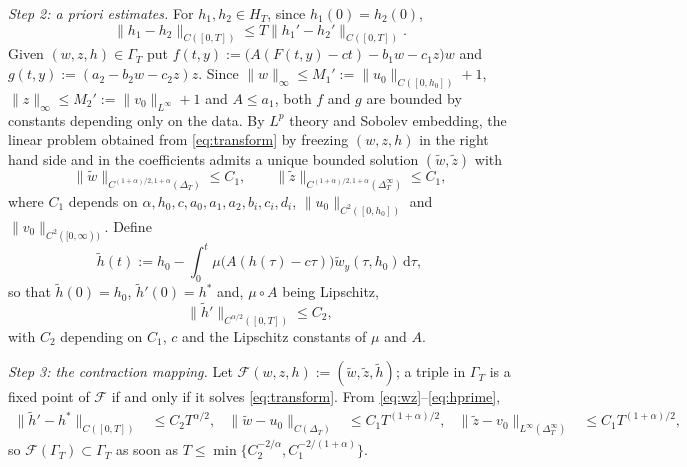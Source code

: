 \documentclass[reqno]{amsart}
\theoremstyle{plain}
\theoremstyle{definition}
\theoremstyle{remark}
\begin{document}
\textit{Step 2: a priori estimates.} For $h_1,h_2 \in H_T$, since
$h_1(0)=h_2(0)$,
\begin{equation}\label{eq:h12}
	\|h_1 - h_2\|_{C([0,T])} \le T \|h_1' - h_2'\|_{C([0,T])}.
\end{equation}
Given $(w,z,h)\in\Gamma_T$ put
$f(t,y):=\big(A(F(t,y)-ct)-b_1w-c_1z\big)w$ and
$g(t,y):=(a_2-b_2w-c_2z)z$. Since $\|w\|_\infty\le M_1':=\|u_0\|_{C([0,h_0])}+1$,
$\|z\|_\infty\le M_2':=\|v_0\|_{L^\infty}+1$ and $A\le a_1$, both $f$ and $g$ are
bounded by constants depending only on the data. By $L^p$ theory and Sobolev
embedding, the linear problem obtained from \eqref{eq:transform} by freezing
$(w,z,h)$ in the right hand side and in the coefficients admits a unique bounded
solution $(\tilde w,\tilde z)$ with
\begin{equation}\label{eq:wz}
	\|\tilde{w} \|_{C^{(1+\alpha)/2,1+\alpha}(\Delta_T)} \le C_1, \qquad \|\tilde{z}\|_{C^{(1+\alpha)/2,1+\alpha}(\Delta_T^\infty)} \le C_1,
\end{equation}
where $C_1$ depends on $\alpha,h_0,c,a_0,a_1,a_2,b_i,c_i,d_i$,
$\|u_0\|_{C^2([0,h_0])}$ and $\|v_0\|_{C^2([0,\infty))}$. Define
\[
\tilde{h}(t) := h_0 - \int_0^t \mu \big( A(h(\tau) - c\tau) \big) \tilde{w}_y(\tau, h_0)\,\mathrm{d}\tau ,
\]
so that $\tilde h(0)=h_0$, $\tilde h'(0)=h^*$ and, $\mu\circ A$ being Lipschitz,
\begin{equation}\label{eq:hprime}
	\|\tilde{h}'\|_{C^{\alpha/2}([0,T])} \le C_2 ,
\end{equation}
with $C_2$ depending on $C_1$, $c$ and the Lipschitz constants of $\mu$ and $A$.

\textit{Step 3: the contraction mapping.} Let
$\mathcal{F}(w,z,h):=(\tilde w,\tilde z,\tilde h)$; a triple in $\Gamma_T$ is a
fixed point of $\mathcal F$ if and only if it solves \eqref{eq:transform}. From
\eqref{eq:wz}--\eqref{eq:hprime},
\begin{align*}
	\|\tilde{h}' - h^*\|_{C([0,T])} &\le C_2 T^{\alpha/2}, &
	\|\tilde{w} - u_0\|_{C(\Delta_T)} &\le C_1 T^{(1+\alpha)/2}, &
	\|\tilde{z} - v_0\|_{L^\infty(\Delta_T^\infty)} &\le C_1 T^{(1+\alpha)/2},
\end{align*}
so $\mathcal F(\Gamma_T)\subset\Gamma_T$ as soon as
$T \le \min\{C_2^{-2/\alpha}, C_1^{-2/(1+\alpha)}\}$.
\end{document}
